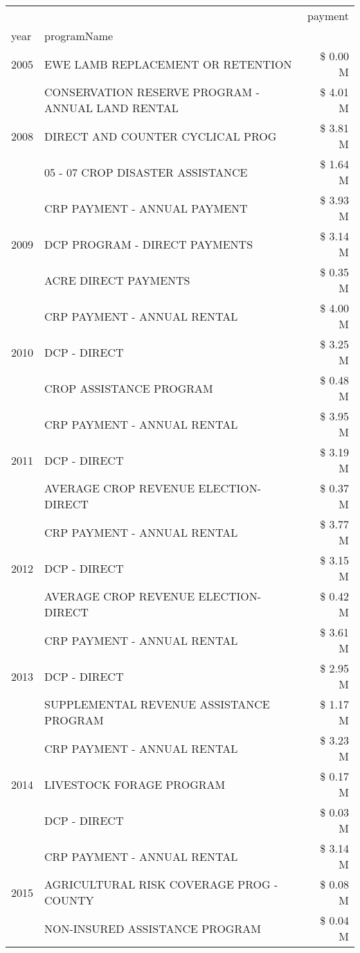 \begin{tabular}{llr}
\toprule
 &  & payment \\
year & programName &  \\
\midrule
2005 & EWE LAMB REPLACEMENT OR RETENTION & \$ 0.00 M \\
\cline{1-3}
\multirow[t]{3}{*}{2008} & CONSERVATION RESERVE PROGRAM - ANNUAL LAND RENTAL & \$ 4.01 M \\
 & DIRECT AND COUNTER CYCLICAL PROG & \$ 3.81 M \\
 & 05 - 07 CROP DISASTER ASSISTANCE & \$ 1.64 M \\
\cline{1-3}
\multirow[t]{3}{*}{2009} & CRP PAYMENT - ANNUAL PAYMENT & \$ 3.93 M \\
 & DCP PROGRAM - DIRECT PAYMENTS & \$ 3.14 M \\
 & ACRE DIRECT PAYMENTS & \$ 0.35 M \\
\cline{1-3}
\multirow[t]{3}{*}{2010} & CRP PAYMENT - ANNUAL RENTAL & \$ 4.00 M \\
 & DCP - DIRECT & \$ 3.25 M \\
 & CROP ASSISTANCE PROGRAM & \$ 0.48 M \\
\cline{1-3}
\multirow[t]{3}{*}{2011} & CRP PAYMENT - ANNUAL RENTAL & \$ 3.95 M \\
 & DCP - DIRECT & \$ 3.19 M \\
 & AVERAGE CROP REVENUE ELECTION-DIRECT & \$ 0.37 M \\
\cline{1-3}
\multirow[t]{3}{*}{2012} & CRP PAYMENT - ANNUAL RENTAL & \$ 3.77 M \\
 & DCP - DIRECT & \$ 3.15 M \\
 & AVERAGE CROP REVENUE ELECTION-DIRECT & \$ 0.42 M \\
\cline{1-3}
\multirow[t]{3}{*}{2013} & CRP PAYMENT - ANNUAL RENTAL & \$ 3.61 M \\
 & DCP - DIRECT & \$ 2.95 M \\
 & SUPPLEMENTAL REVENUE ASSISTANCE PROGRAM & \$ 1.17 M \\
\cline{1-3}
\multirow[t]{3}{*}{2014} & CRP PAYMENT - ANNUAL RENTAL & \$ 3.23 M \\
 & LIVESTOCK FORAGE PROGRAM & \$ 0.17 M \\
 & DCP - DIRECT & \$ 0.03 M \\
\cline{1-3}
\multirow[t]{3}{*}{2015} & CRP PAYMENT - ANNUAL RENTAL & \$ 3.14 M \\
 & AGRICULTURAL RISK COVERAGE PROG - COUNTY & \$ 0.08 M \\
 & NON-INSURED ASSISTANCE PROGRAM & \$ 0.04 M \\

\end{tabular}
